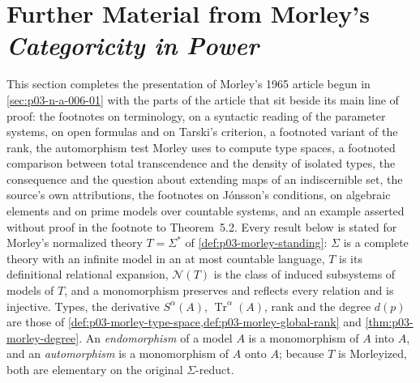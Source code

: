 \section{Further Material from Morley's \emph{Categoricity in Power}}
\label{sec:p03-w03-p03-033-morley-supplement}

This section completes the presentation of Morley's 1965 article begun in
\cref{sec:p03-n-a-006-01} with the parts of the article that sit beside its
main line of proof: the footnotes on terminology, on a syntactic reading
of the parameter systems, on open formulas and on Tarski's criterion, a
footnoted variant of the rank, the automorphism test
Morley uses to compute type spaces, a footnoted comparison between total
transcendence and the density of isolated types, the consequence and the
question about extending maps of an indiscernible set, the source's own
attributions, the footnotes on Jónsson's conditions, on algebraic
elements and on prime models over countable systems, and an example
asserted without proof in the footnote to Theorem~5.2. Every result below is stated for Morley's normalized theory
\(T=\Sigma^*\) of \cref{def:p03-morley-standing}: \(\Sigma\) is a complete
theory with an infinite model in an at most countable language, \(T\) is its
definitional relational expansion, \(\mathcal N(T)\) is the class of induced
subsystems of models of \(T\), and a monomorphism preserves and reflects
every relation and is injective. Types, the derivative
\(S^\alpha(A)\), \(\operatorname{Tr}^\alpha(A)\), rank and the degree
\(d(p)\) are those of \cref{def:p03-morley-type-space,def:p03-morley-global-rank}
and \cref{thm:p03-morley-degree}. An \emph{endomorphism} of a model \(A\) is
a monomorphism of \(A\) into \(A\), and an \emph{automorphism} is a
monomorphism of \(A\) onto \(A\); because \(T\) is Morleyized, both are
elementary on the original \(\Sigma\)-reduct.

